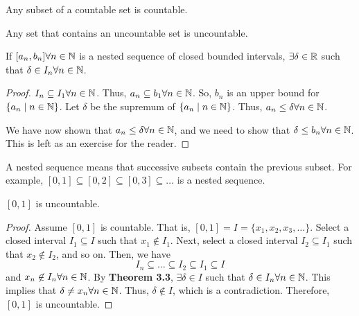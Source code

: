 \begin{theorem}
    Any subset of a countable set is countable.
\end{theorem}
\begin{theorem}
    Any set that contains an uncountable set is uncountable.
\end{theorem}

\begin{theorem}
    If $[a_n, b_n] \forall n \in \mathbb{N}$ is a nested sequence of closed bounded intervals, $\exists \delta \in \mathbb{R}$ such that $\delta \in I_n \forall n \in \mathbb{N}$.
\end{theorem}
\begin{proof}
    $I_n \subseteq I_1 \forall n \in \mathbb{N}$. Thus, $a_n \subseteq b_1 \forall n \in \mathbb{N}$. So, $b_n$ is an upper bound for $\{a_n \mid n \in \mathbb{N}\}$. Let $\delta$ be the supremum of $\{a_n \mid n \in \mathbb{N}\}$. Thus, $a_n \leq \delta \forall n \in \mathbb{N}$.

    We have now shown that $a_n \leq \delta \forall n \in \mathbb{N}$, and we need to show that $\delta \leq b_n \forall n \in \mathbb{N}$. This is left as an exercise for the reader.
\end{proof}
\begin{remark}
    A nested sequence means that successive subsets contain the previous subset. For example, $[0, 1] \subseteq [0, 2] \subseteq [0, 3] \subseteq \ldots$ is a nested sequence.
\end{remark}

\begin{theorem}
    $[0, 1]$ is uncountable.
\end{theorem}
\begin{proof}
    Assume $[0, 1]$ is countable. That is, $[0, 1] = I = \{x_1, x_2, x_3, \ldots\}$. Select a closed interval $I_1 \subseteq I$ such that $x_1 \not\in I_1$. Next, select a closed interval $I_2 \subseteq I_1$ such that $x_2 \not\in I_2$, and so on. Then, we have $$ I_n \subseteq \ldots \subseteq I_2 \subseteq I_1 \subseteq I $$ and $x_n \not\in I_n \forall n \in \mathbb{N}$. By \textbf{Theorem 3.3}, $\exists \delta \in I$ such that $\delta \in I_n \forall n \in \mathbb{N}$. This implies that $\delta \neq x_n \forall n \in \mathbb{N}$. Thus, $\delta \not\in I$, which is a contradiction. Therefore, $[0, 1]$ is uncountable.
\end{proof}